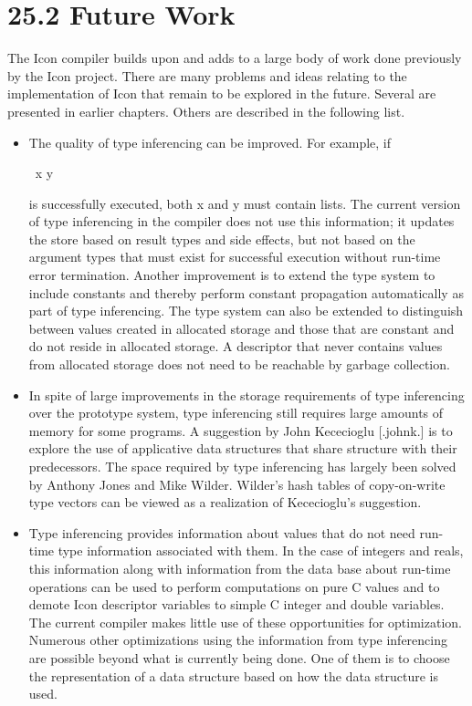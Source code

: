 \section[25.2 Future Work]{25.2 Future Work}

The Icon compiler builds upon and adds to a large body of work done
previously by the Icon project. There are many problems and ideas
relating to the implementation of Icon that remain to be explored in
the future. Several are presented in earlier chapters. Others are
described in the following list.

\liststyleLxxxv
\begin{itemize}
\item 
The quality of type inferencing can be improved. For example, if 

{\ttfamily
\ x {\textbar}{\textbar}{\textbar} y}

\noindent is successfully executed, both x and y must contain
lists. The current version of type inferencing in the compiler does
not use this information; it updates the store based on result types
and side effects, but not based on the argument types that must exist
for successful execution without run-time error termination. Another
improvement is to extend the type system to include constants and
thereby perform constant propagation automatically as part of type
inferencing.  The type system can also be extended to distinguish
between values created in allocated storage and those that are
constant and do not reside in allocated storage. A descriptor that
never contains values from allocated storage does not need to be
reachable by garbage collection.

\item In spite of large improvements in the storage requirements of
type inferencing over the prototype system, type inferencing still requires
large amounts of memory for some programs. A suggestion by John
Kececioglu [.johnk.] is to explore the use of applicative data
structures that share structure with their predecessors. The space
required by type inferencing has largely been solved by Anthony Jones
and Mike Wilder. Wilder's hash tables of copy-on-write type vectors
can be viewed as a realization of Kececioglu's suggestion.

\item Type inferencing provides information about values that do not
need run-time type information associated with them. In the case of
integers and reals, this information along with information from the
data base about run-time operations can be used to perform
computations on pure C values and to demote Icon descriptor variables
to simple C integer and double variables. The current compiler makes
little use of these opportunities for optimization. Numerous other
optimizations using the information from type inferencing are possible
beyond what is currently being done. One of them is to choose the
representation of a data structure based on how the data structure is used.


\end{itemize}
